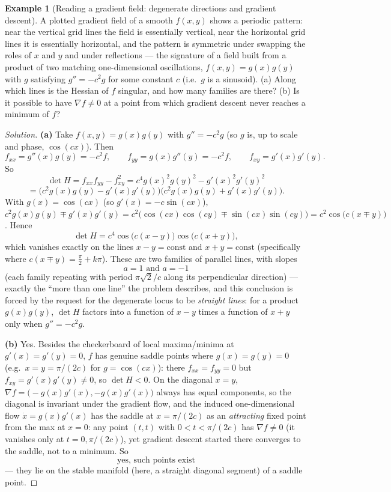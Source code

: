 \documentclass[11pt]{article}
\theoremstyle{definition}
\newtheorem{example}{Example}[section]
\begin{document}
\begin{example}[Reading a gradient field: degenerate directions and gradient descent]
A plotted gradient field of a smooth $f(x,y)$ shows a periodic pattern: near the vertical grid lines the field is essentially vertical, near the horizontal grid lines it is essentially horizontal, and the pattern is symmetric under swapping the roles of $x$ and $y$ and under reflections — the signature of a field built from a product of two matching one-dimensional oscillations, $f(x,y)=g(x)g(y)$ with $g$ satisfying $g''=-c^2g$ for some constant $c$ (i.e.\ $g$ is a sinusoid). (a) Along which lines is the Hessian of $f$ singular, and how many families are there? (b) Is it possible to have $\nabla f\neq0$ at a point from which gradient descent never reaches a minimum of $f$?
\end{example}

\begin{proof}[Solution]
\textbf{(a)} Take $f(x,y)=g(x)g(y)$ with $g''=-c^2g$ (so $g$ is, up to scale and phase, $\cos(cx)$). Then
\[
f_{xx}=g''(x)g(y)=-c^2f, \qquad f_{yy}=g(x)g''(y)=-c^2f, \qquad f_{xy}=g'(x)g'(y).
\]
So
\[
\det H=f_{xx}f_{yy}-f_{xy}^2=c^4g(x)^2g(y)^2-g'(x)^2g'(y)^2
\]
\[
=\big(c^2g(x)g(y)-g'(x)g'(y)\big)\big(c^2g(x)g(y)+g'(x)g'(y)\big).
\]
With $g(x)=\cos(cx)$ (so $g'(x)=-c\sin(cx)$), $c^2g(x)g(y)\mp g'(x)g'(y)=c^2\big(\cos(cx)\cos(cy)\mp\sin(cx)\sin(cy)\big)=c^2\cos\!\big(c(x\mp y)\big)$. Hence
\[
\det H = c^4\cos\big(c(x-y)\big)\cos\big(c(x+y)\big),
\]
which vanishes exactly on the lines $x-y=\text{const}$ and $x+y=\text{const}$ (specifically where $c(x\mp y)=\tfrac{\pi}{2}+k\pi$). These are two families of parallel lines, with slopes
\[
\boxed{a=1 \text{ and } a=-1}
\]
(each family repeating with period $\pi\sqrt2/c$ along its perpendicular direction) — exactly the ``more than one line'' the problem describes, and this conclusion is forced by the request for the degenerate locus to be \emph{straight lines}: for a product $g(x)g(y)$, $\det H$ factors into a function of $x-y$ times a function of $x+y$ only when $g''=-c^2g$.

\textbf{(b)} Yes. Besides the checkerboard of local maxima/minima at $g'(x)=g'(y)=0$, $f$ has genuine saddle points where $g(x)=g(y)=0$ (e.g.\ $x=y=\pi/(2c)$ for $g=\cos(cx)$): there $f_{xx}=f_{yy}=0$ but $f_{xy}=g'(x)g'(y)\neq0$, so $\det H<0$. On the diagonal $x=y$, $\nabla f=\big({-}g(x)g'(x),-g(x)g'(x)\big)$ always has equal components, so the diagonal is invariant under the gradient flow, and the induced one-dimensional flow $\dot x=g(x)g'(x)$ has the saddle at $x=\pi/(2c)$ as an \emph{attracting} fixed point from the max at $x=0$: any point $(t,t)$ with $0<t<\pi/(2c)$ has $\nabla f\neq0$ (it vanishes only at $t=0,\pi/(2c)$), yet gradient descent started there converges to the saddle, not to a minimum. So
\[
\boxed{\text{yes, such points exist}}
\]
— they lie on the stable manifold (here, a straight diagonal segment) of a saddle point.
\end{proof}
\end{document}
